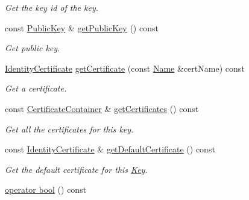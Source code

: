 \begin{DoxyCompactItemize}
\begin{DoxyCompactList}\small\item\em Get the key id of the key. \end{DoxyCompactList}\item 
const \hyperlink{classndn_1_1PublicKey}{Public\+Key} \& \hyperlink{classndn_1_1security_1_1Key_ad0310b46e0da4e040fcdc81efe7c36d3}{get\+Public\+Key} () const\hypertarget{classndn_1_1security_1_1Key_ad0310b46e0da4e040fcdc81efe7c36d3}{}\label{classndn_1_1security_1_1Key_ad0310b46e0da4e040fcdc81efe7c36d3}

\begin{DoxyCompactList}\small\item\em Get public key. \end{DoxyCompactList}\item 
\hyperlink{classndn_1_1IdentityCertificate}{Identity\+Certificate} \hyperlink{classndn_1_1security_1_1Key_ac8d4be4de6fab5a64e475a9f822f89f3}{get\+Certificate} (const \hyperlink{classndn_1_1Name}{Name} \&cert\+Name) const
\begin{DoxyCompactList}\small\item\em Get a certificate. \end{DoxyCompactList}\item 
const \hyperlink{classndn_1_1security_1_1CertificateContainer}{Certificate\+Container} \& \hyperlink{classndn_1_1security_1_1Key_aee45639a40689efef18d5a56531d8f11}{get\+Certificates} () const\hypertarget{classndn_1_1security_1_1Key_aee45639a40689efef18d5a56531d8f11}{}\label{classndn_1_1security_1_1Key_aee45639a40689efef18d5a56531d8f11}

\begin{DoxyCompactList}\small\item\em Get all the certificates for this key. \end{DoxyCompactList}\item 
const \hyperlink{classndn_1_1IdentityCertificate}{Identity\+Certificate} \& \hyperlink{classndn_1_1security_1_1Key_af6f712310047a8f0fba11e9a76ccf5c5}{get\+Default\+Certificate} () const
\begin{DoxyCompactList}\small\item\em Get the default certificate for this \hyperlink{classndn_1_1security_1_1Key}{Key}. \end{DoxyCompactList}\item 
\hyperlink{classndn_1_1security_1_1Key_a1a086f956d559c17c5fac147bd82c8cf}{operator bool} () const\hypertarget{classndn_1_1security_1_1Key_a1a086f956d559c17c5fac147bd82c8cf}{}\label{classndn_1_1security_1_1Key_a1a086f956d559c17c5fac147bd82c8cf}


\end{DoxyCompactItemize}
